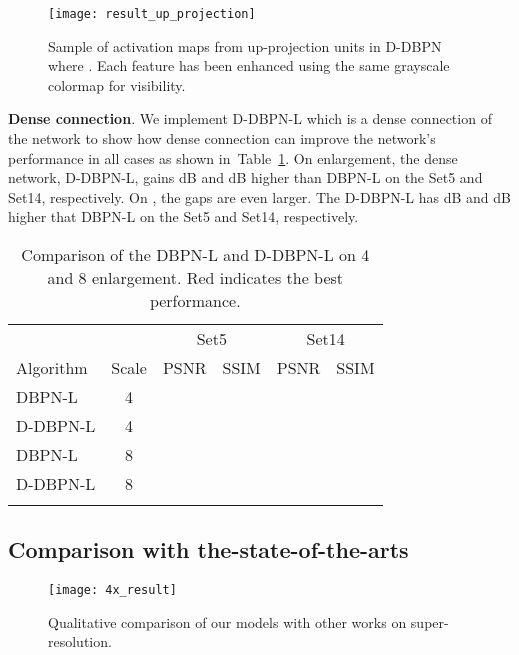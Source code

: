 \documentclass[10pt,twocolumn,letterpaper]{article}
\begin{document}
\begin{figure}[t]
\centering
\texttt{[image: result\_up\_projection]}
\caption{Sample of activation maps from up-projection units in D-DBPN where . Each feature has been enhanced using the same grayscale colormap for visibility.}
\label{figure:result_up_projection}
\end{figure} 

\textbf{Dense connection}. We implement D-DBPN-L which is a dense connection of the  network to show how dense connection can improve the network's performance in all cases as shown in~Table~\ref{tab:dense}. On  enlargement, the dense network, D-DBPN-L, gains  dB and  dB higher than DBPN-L on the Set5 and Set14, respectively. On , the gaps are even larger. The D-DBPN-L has  dB and  dB higher that DBPN-L on the Set5 and Set14, respectively.
\begin{table}[h!]
\small
\caption{Comparison of the DBPN-L and D-DBPN-L on 4 and 8 enlargement. {\color{red}Red} indicates the best performance.}
\centering
\label{tab:dense}
\begin{tabular}{*1l*1c|*2c*2c}
\hline\noalign{\smallskip}
\smallskip & &\multicolumn{2}{c}{Set5} & \multicolumn{2}{c}{Set14} \\         
Algorithm & Scale & PSNR&SSIM & PSNR&SSIM   \\
\noalign{\smallskip}\hline\noalign{\smallskip}
DBPN-L&4		&&&&\\
D-DBPN-L&4		&{\color{red}}&{\color{red}}&{\color{red}}&{\color{red}}\\
\noalign{\smallskip}\hline\noalign{\smallskip}
DBPN-L&8		&&&&\\
D-DBPN-L&8		&{\color{red}}&{\color{red}}&{\color{red}}&{\color{red}}\\
\noalign{\smallskip}\hline
\end{tabular}
\end{table}



\subsection{Comparison with the-state-of-the-arts}
\begin{figure*}
\centering
\texttt{[image: 4x\_result]}
\caption{Qualitative comparison of our models with other works on  super-resolution.}
\label{figure:4x_result}
\end{figure*}
\end{document}
